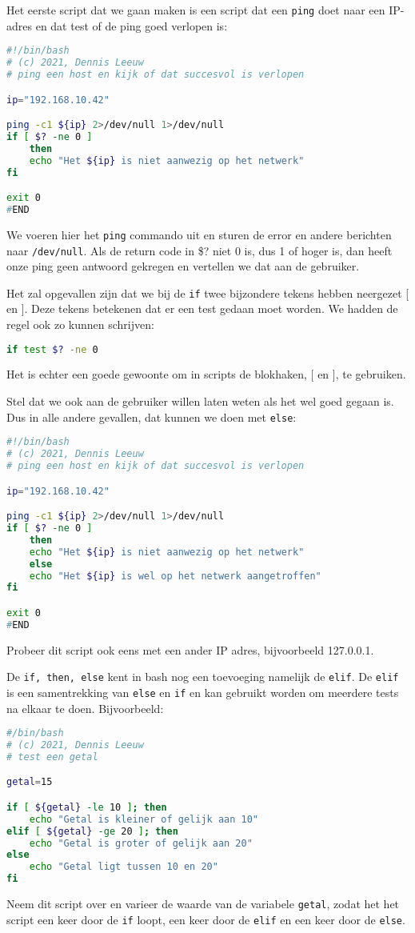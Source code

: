 Het eerste script dat we gaan maken is een script dat een \texttt{ping} doet naar een IP-adres en dat test of de ping goed verlopen is:
\begin{lstlisting}[language=bash]
#!/bin/bash
# (c) 2021, Dennis Leeuw
# ping een host en kijk of dat succesvol is verlopen

ip="192.168.10.42"

ping -c1 ${ip} 2>/dev/null 1>/dev/null
if [ $? -ne 0 ]
	then
	echo "Het ${ip} is niet aanwezig op het netwerk"
fi

exit 0
#END
\end{lstlisting}
We voeren hier het \texttt{ping} commando uit en sturen de error en andere berichten naar \texttt{/dev/null}. Als de return code in \$? niet 0 is, dus 1 of hoger is, dan heeft onze ping geen antwoord gekregen en vertellen we dat aan de gebruiker.

Het zal opgevallen zijn dat we bij de \texttt{if} twee bijzondere tekens hebben neergezet [ en ]. Deze tekens betekenen dat er een test gedaan moet worden. We hadden de regel ook zo kunnen schrijven:
\begin{lstlisting}[language=bash]
if test $? -ne 0
\end{lstlisting}
Het is echter een goede gewoonte om in scripts de blokhaken, [ en ], te gebruiken.

Stel dat we ook aan de gebruiker willen laten weten als het wel goed gegaan is. Dus in alle andere gevallen, dat kunnen we doen met \texttt{else}:
\begin{lstlisting}[language=bash]
#!/bin/bash
# (c) 2021, Dennis Leeuw
# ping een host en kijk of dat succesvol is verlopen

ip="192.168.10.42"

ping -c1 ${ip} 2>/dev/null 1>/dev/null
if [ $? -ne 0 ]
	then
	echo "Het ${ip} is niet aanwezig op het netwerk"
	else
	echo "Het ${ip} is wel op het netwerk aangetroffen"
fi

exit 0
#END
\end{lstlisting}
Probeer dit script ook eens met een ander IP adres, bijvoorbeeld 127.0.0.1.

De \texttt{if, then, else} kent in bash nog een toevoeging namelijk de \texttt{elif}. De \texttt{elif} is een samentrekking van \texttt{else} en \texttt{if} en kan gebruikt worden om meerdere tests na elkaar te doen. Bijvoorbeeld:
\begin{lstlisting}[language=bash]
#/bin/bash
# (c) 2021, Dennis Leeuw
# test een getal

getal=15

if [ ${getal} -le 10 ]; then
	echo "Getal is kleiner of gelijk aan 10"
elif [ ${getal} -ge 20 ]; then
	echo "Getal is groter of gelijk aan 20"
else
	echo "Getal ligt tussen 10 en 20"
fi
\end{lstlisting}
Neem dit script over en varieer de waarde van de variabele \texttt{getal}, zodat het het script een keer door de \texttt{if} loopt, een keer door de \texttt{elif} en een keer door de \texttt{else}.
